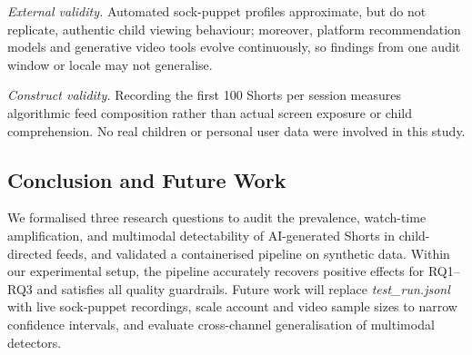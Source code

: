 \documentclass[conference]{IEEEtran}
\begin{document}
\emph{External validity.} Automated sock-puppet profiles approximate, but do not replicate, authentic child viewing behaviour; moreover, platform recommendation models and generative video tools evolve continuously, so findings from one audit window or locale may not generalise.

\emph{Construct validity.} Recording the first 100 Shorts per session measures algorithmic feed composition rather than actual screen exposure or child comprehension. No real children or personal user data were involved in this study.

\subsection{Conclusion and Future Work}
We formalised three research questions to audit the prevalence, watch-time amplification, and multimodal detectability of AI-generated Shorts in child-directed feeds, and validated a containerised pipeline on synthetic data. Within our experimental setup, the pipeline accurately recovers positive effects for RQ1--RQ3 and satisfies all quality guardrails. Future work will replace \emph{test\_run.jsonl} with live sock-puppet recordings, scale account and video sample sizes to narrow confidence intervals, and evaluate cross-channel generalisation of multimodal detectors.



\end{document}
